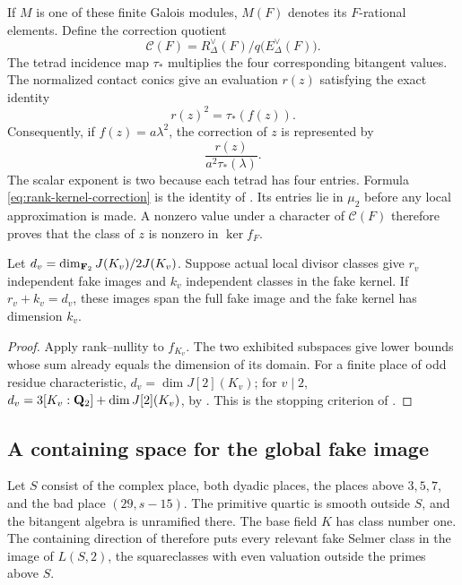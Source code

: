 If $M$ is one of these finite Galois modules, $M(F)$ denotes its
$F$-rational elements.  Define the correction quotient
\[
 \mathcal C(F)=R_\Delta^\vee(F)/q\bigl(E_\Delta^\vee(F)\bigr).
\]
The tetrad incidence map $\tau_*$ multiplies the four corresponding
bitangent values.  The normalized contact conics give an evaluation
$r(z)$ satisfying the exact identity
\[
                         r(z)^2=\tau_*(f(z)).
\]
Consequently, if $f(z)=a\lambda^2$, the correction of $z$ is represented by
\begin{equation}\label{eq:rank-kernel-correction}
             \frac{r(z)}{a^2\tau_*(\lambda)}.
\end{equation}
The scalar exponent is two because each tetrad has four entries.
Formula \eqref{eq:rank-kernel-correction} is the identity of
\cite[Lemma~A.24(a)]{BPS}.  Its entries lie in $\mu_2$ before any
local approximation is made.  A nonzero value under a character of
$\mathcal C(F)$ therefore proves that the class of $z$ is nonzero in
$\ker f_F$.

\begin{lemma}\label{lem:rank-local-completeness}
Let $d_v=\dim_{\mathbf F_2}J(K_v)/2J(K_v)$.  Suppose actual local divisor
classes give $r_v$ independent fake images and $k_v$ independent classes
in the fake kernel.  If $r_v+k_v=d_v$, these images span the full fake
image and the fake kernel has dimension $k_v$.
\end{lemma}

\begin{proof}
Apply rank--nullity to $f_{K_v}$.  The two exhibited subspaces give
lower bounds whose sum already equals the dimension of its domain.
For a finite place of odd residue characteristic,
$d_v=\dim J[2](K_v)$; for $v\mid2$,
$d_v=3[K_v:\mathbf Q_2]+\dim J[2](K_v)$, by
\cite[Remark~11.6]{BPS}.  This is the stopping criterion of
\cite[Lemma~A.24(b)]{BPS}.
\end{proof}

\subsection{A containing space for the global fake image}

Let $S$ consist of the complex place, both dyadic places, the places above
$3,5,7$, and the bad place $(29,s-15)$.  The primitive quartic is
smooth outside $S$, and the bitangent algebra is unramified there.
The base field $K$ has class number one.  The containing direction of
\cite[Propositions~7.2--7.3 and Theorem~10.9(a)]{BPS} therefore puts
every relevant fake Selmer class in the image of $L(S,2)$, the
squareclasses with even valuation outside the primes above $S$.

